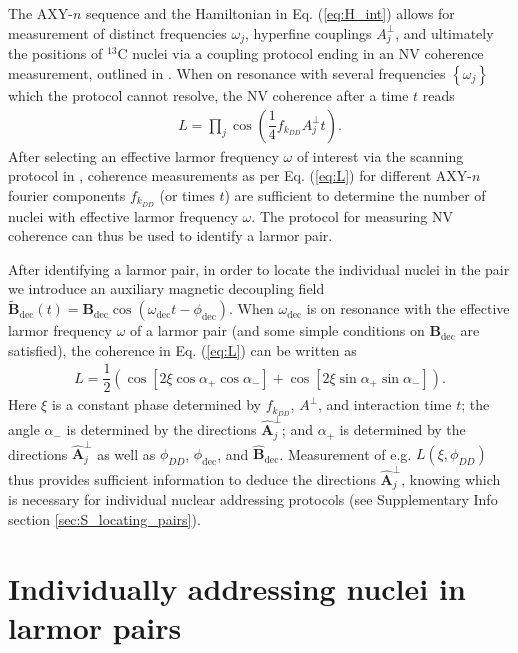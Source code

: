 \documentclass[twocolumn]{revtex4-1}
\renewcommand{\t}{\text} %
\newcommand{\f}[2]{\dfrac{#1}{#2}} %
\newcommand{\p}[1]{\left(#1\right)} %
\renewcommand{\sp}[1]{\left[#1\right]} %
\renewcommand{\set}[1]{\left\{#1\right\}} %
\renewcommand{\v}{\bm} %
\newcommand{\uv}[1]{\hat{\v{#1}}} %
\begin{document}
The AXY-$n$ sequence and the Hamiltonian in Eq. (\ref{eq:H_int})
allows for measurement of distinct frequencies $\omega_j$, hyperfine
couplings $A_j^\perp$, and ultimately the positions of $^{13}$C nuclei
via a coupling protocol ending in an NV coherence measurement,
outlined in \cite{wang2016positioning}. When on resonance with several
frequencies $\set{\omega_j}$ which the protocol cannot resolve, the NV
coherence after a time $t$ reads
\begin{align}
  \label{eq:L}
  L = \prod_j\cos\p{\f14 f_{k_{DD}}A_j^\perp t}.
\end{align}
After selecting an effective larmor frequency $\omega$ of interest via
the scanning protocol in \cite{wang2016positioning}, coherence
measurements as per Eq. (\ref{eq:L}) for different AXY-$n$ fourier
components $f_{k_{DD}}$ (or times $t$) are sufficient to determine the
number of nuclei with effective larmor frequency $\omega$. The
protocol for measuring NV coherence can thus be used to identify a
larmor pair.

After identifying a larmor pair, in order to locate the individual
nuclei in the pair we introduce an auxiliary magnetic decoupling field
$\tilde{\v B}_{\t{dec}}\p{t} = \v
B_{\t{dec}}\cos\p{\omega_{\t{dec}}t-\phi_{\t{dec}}}$. When
$\omega_{\t{dec}}$ is on resonance with the effective larmor frequency
$\omega$ of a larmor pair (and some simple conditions on
$\v B_{\t{dec}}$ are satisfied), the coherence in Eq. (\ref{eq:L}) can
be written as
\begin{align}
  \label{eq:L_dec}
  L = \f12\p{\cos\sp{2\xi\cos\alpha_+\cos\alpha_-}
  + \cos\sp{2\xi\sin\alpha_+\sin\alpha_-}}.
\end{align}
Here $\xi$ is a constant phase determined by $f_{k_{DD}}$, $A^\perp$,
and interaction time $t$; the angle $\alpha_-$ is determined by the
directions $\uv A_j^\perp$; and $\alpha_+$ is determined by the
directions $\uv A_j^\perp$ as well as $\phi_{DD}$, $\phi_{\t{dec}}$,
and $\uv B_{\t{dec}}$. Measurement of e.g.  $L\p{\xi,\phi_{DD}}$ thus
provides sufficient information to deduce the directions
$\uv A_j^\perp$, knowing which is necessary for individual nuclear
addressing protocols (see Supplementary Info section
\ref{sec:S_locating_pairs}).


\section{Individually addressing nuclei in larmor pairs}
\end{document}
